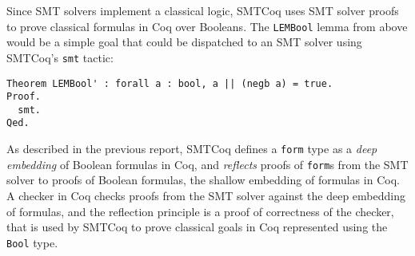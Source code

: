 \documentclass{article}
\begin{document}
	Since SMT solvers implement 
	a classical logic, SMTCoq 
	uses SMT solver proofs to 
	prove classical formulas in 
	Coq over Booleans. The 
	\texttt{LEMBool} lemma from 
	above would be a simple goal that 
	could be dispatched to an SMT 
	solver using SMTCoq's \texttt{smt}
	tactic:
\begin{verbatim}
Theorem LEMBool' : forall a : bool, a || (negb a) = true.
Proof.
  smt.
Qed.
\end{verbatim}
	As described in the previous report, 
	SMTCoq defines a \texttt{form} type
	as a \textit{deep embedding} of Boolean 
	formulas in Coq, and \textit{reflects} 
	proofs of \texttt{form}s from the SMT 
	solver to proofs of Boolean formulas, 
	the shallow embedding of formulas 
	in Coq. A checker in Coq checks 
	proofs from the SMT solver against
	the deep embedding of formulas, and 
	the reflection principle is a proof
	of correctness of the checker, that 
	is used by SMTCoq to prove classical
	goals in Coq represented using the
	\texttt{Bool} type.
	
\end{document}
